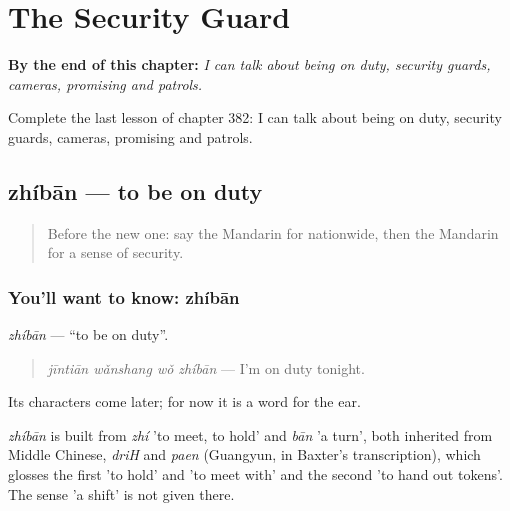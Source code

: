 
\chapter{The Security Guard}
\label{ch:zh-the-security-guard}

\begin{chapteropening}
\textbf{By the end of this chapter:} \emph{I can talk about being on duty, security guards, cameras, promising and patrols.}

Complete the last lesson of chapter 382: I can talk about being on duty, security guards, cameras, promising and patrols.
\end{chapteropening}

\section[zhíbān]{zhíbān — to be on duty}

\label{lesson:ZH-C382-zhiban}



\begin{quote}
Before the new one: say the Mandarin for nationwide, then the Mandarin for a sense of security.
\end{quote}

\subsection*{You'll want to know: zhíbān}
\emph{zhíbān} — \textquotedblleft{}to be on duty\textquotedblright{}.

\begin{quote}
\emph{jīntiān wǎnshang wǒ zhíbān} — I'm on duty tonight.
\end{quote}

Its characters come later; for now it is a word for the ear.

\begin{cousinweb}
\emph{zhíbān} is built from \emph{zhí} 'to meet, to hold' and \emph{bān} 'a turn', both inherited from Middle Chinese, \emph{driH} and \emph{paen} (Guangyun, in Baxter's transcription), which glosses the first 'to hold' and 'to meet with' and the second 'to hand out tokens'. The sense 'a shift' is not given there.
\end{cousinweb}

